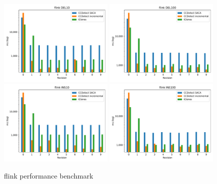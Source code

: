 \vfill

\newpage
\null
\vfill

\begin{figure}[H]
    \begin{center}
        \includegraphics[width=0.49\textwidth]{figures/performancegraphs/flink_DEL10.pdf}
        \includegraphics[width=0.49\textwidth]{figures/performancegraphs/flink_DEL100.pdf}
        \includegraphics[width=0.49\textwidth]{figures/performancegraphs/flink_INS10.pdf}
        \includegraphics[width=0.49\textwidth]{figures/performancegraphs/flink_INS100.pdf}
    \end{center}
    \caption{flink performance benchmark}
    \label{fig:flink}
\end{figure}

